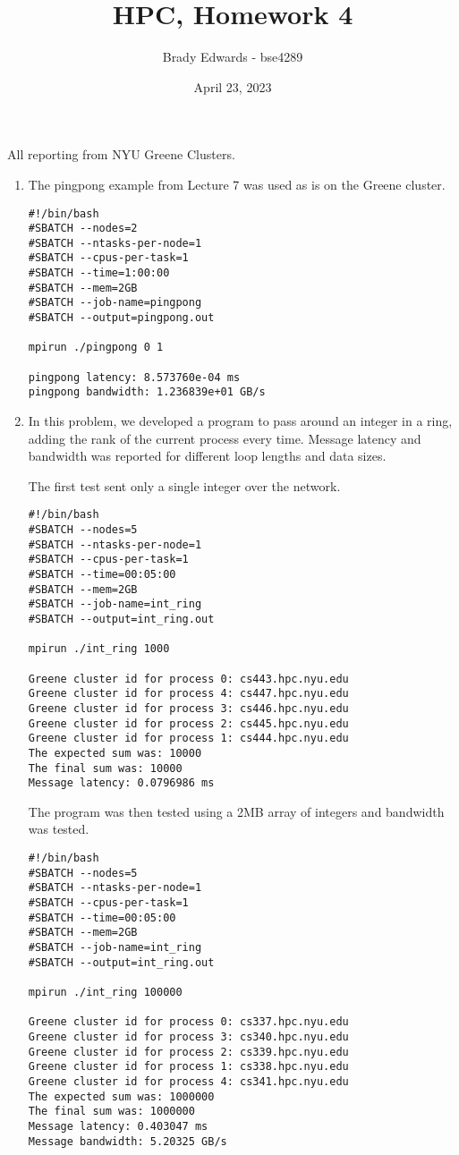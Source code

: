 \documentclass{article}
\title{HPC, Homework 4}
\author{Brady Edwards - bse4289}
\date{April 23, 2023}
\begin{document}
\maketitle
All reporting from NYU Greene Clusters.  
\begin{enumerate}
    \item The pingpong example from Lecture 7 was used as is on the Greene cluster. 
    \begin{verbatim}
#!/bin/bash
#SBATCH --nodes=2
#SBATCH --ntasks-per-node=1
#SBATCH --cpus-per-task=1
#SBATCH --time=1:00:00
#SBATCH --mem=2GB
#SBATCH --job-name=pingpong
#SBATCH --output=pingpong.out

mpirun ./pingpong 0 1

pingpong latency: 8.573760e-04 ms
pingpong bandwidth: 1.236839e+01 GB/s
    \end{verbatim}

    \item In this problem, we developed a program to pass around an integer in a ring, 
adding the rank of the current process every time.  Message latency and bandwidth was 
reported for different loop lengths and data sizes.

    The first test sent only a single integer over the network.
    \begin{verbatim}
#!/bin/bash
#SBATCH --nodes=5
#SBATCH --ntasks-per-node=1
#SBATCH --cpus-per-task=1
#SBATCH --time=00:05:00
#SBATCH --mem=2GB
#SBATCH --job-name=int_ring
#SBATCH --output=int_ring.out

mpirun ./int_ring 1000
    
Greene cluster id for process 0: cs443.hpc.nyu.edu
Greene cluster id for process 4: cs447.hpc.nyu.edu
Greene cluster id for process 3: cs446.hpc.nyu.edu
Greene cluster id for process 2: cs445.hpc.nyu.edu
Greene cluster id for process 1: cs444.hpc.nyu.edu
The expected sum was: 10000
The final sum was: 10000
Message latency: 0.0796986 ms
    \end{verbatim}

    The program was then tested using a 2MB array of integers and bandwidth was tested.
    \begin{verbatim}
#!/bin/bash
#SBATCH --nodes=5
#SBATCH --ntasks-per-node=1
#SBATCH --cpus-per-task=1
#SBATCH --time=00:05:00
#SBATCH --mem=2GB
#SBATCH --job-name=int_ring
#SBATCH --output=int_ring.out

mpirun ./int_ring 100000

Greene cluster id for process 0: cs337.hpc.nyu.edu
Greene cluster id for process 3: cs340.hpc.nyu.edu
Greene cluster id for process 2: cs339.hpc.nyu.edu
Greene cluster id for process 1: cs338.hpc.nyu.edu
Greene cluster id for process 4: cs341.hpc.nyu.edu
The expected sum was: 1000000
The final sum was: 1000000
Message latency: 0.403047 ms
Message bandwidth: 5.20325 GB/s
    \end{verbatim}


\end{enumerate}
\end{document}
